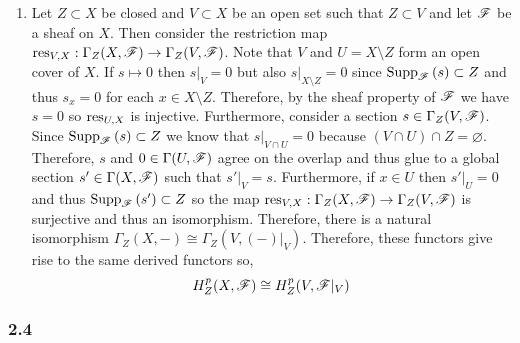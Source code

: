 \documentclass[12pt]{article}
\begin{document}
\begin{enumerate}
\item Let $Z \subset X$ be closed and $V \subset X$ be an open set such that $Z \subset V$ and let $\mathscr{F}$ be a sheaf on $X$. Then consider the restriction map $\mathrm{res}_{V, X} : \Gamma_Z(X, \mathscr{F}) \to \Gamma_Z(V, \mathscr{F})$. Note that $V$ and $U = X \setminus Z$ form an open cover of $X$. If $s \mapsto 0$ then $s|_V = 0$ but also $s|_{X \setminus Z} = 0$ since $\mathrm{Supp}_{\mathscr{F}}\left(s \right) \subset Z$ and thus $s_x = 0$ for each $x \in X \setminus Z$. Therefore, by the sheaf property of $\mathscr{F}$ we have $s = 0$ so $\mathrm{res}_{U,X}$ is injective. Furthermore, consider a section $s \in \Gamma_Z(V, \mathscr{F})$. Since $\mathrm{Supp}_{\mathscr{F}}\left(s \right) \subset Z$ we know that $s |_{V \cap U} = 0$ because $(V \cap U) \cap Z = \varnothing$. Therefore, $s$ and $0 \in \Gamma(U, \mathscr{F})$ agree on the overlap and thus glue to a global section $s' \in \Gamma(X, \mathscr{F})$ such that $s'|_V = s$. Furthermore, if $x \in U$ then $s' |_U = 0$ and thus $\mathrm{Supp}_{\mathscr{F}}\left(s' \right) \subset Z$ so the map $\mathrm{res}_{V, X} : \Gamma_Z(X, \mathscr{F}) \to \Gamma_Z(V, \mathscr{F})$ is surjective and thus an isomorphism. Therefore, there is a natural isomorphism $\Gamma_Z(X, -) \cong \Gamma_Z(V, (-)|_V)$. Therefore, these functors give rise to the same derived functors so,
\[ H^p_Z(X, \mathscr{F}) \cong H^p_Z(V, \mathscr{F}|_V) \] 

\end{enumerate}

\subsubsection{2.4}
\end{document}
